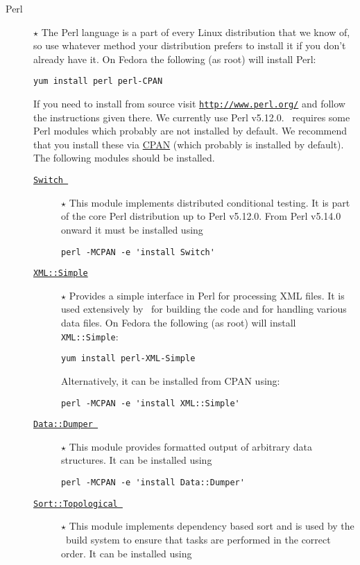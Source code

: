\begin{description}
 \item [Perl] $\star$ The Perl language is a part of every Linux distribution that we know of, so use whatever method your distribution prefers to install it if you don't already have it. On Fedora the following (as root) will install Perl:
\begin{verbatim}
yum install perl perl-CPAN
\end{verbatim}
 If you need to install from source visit \href{http://www.perl.org/}{\tt http://www.perl.org/} and follow the instructions given there. We currently use Perl v5.12.0. \glc\ requires some Perl modules which probably are not installed by default. We recommend that you install these via \href{http://www.cpan.org/}{CPAN} (which probably is installed by default). The following modules should be installed.
 \begin{description}
  \item [\href{http://search.cpan.org/~rgarcia/Switch-2.16/Switch.pm}{{\tt Switch }}] $\star$ This module implements distributed conditional testing. It is part of the core Perl distribution up to Perl v5.12.0. From Perl v5.14.0 onward it must be installed using
\begin{verbatim}
perl -MCPAN -e 'install Switch'
\end{verbatim}
  \item [\href{http://search.cpan.org/~grantm/XML-Simple-2.18/lib/XML/Simple.pm}{{\tt XML::Simple}}] $\star$ Provides a simple interface in Perl for processing XML files. It is used extensively by \glc\ for building the code and for handling various data files. On Fedora the following (as root) will install {\tt XML::Simple}:
\begin{verbatim}
yum install perl-XML-Simple
\end{verbatim}
Alternatively, it can be installed from CPAN using:
\begin{verbatim}
perl -MCPAN -e 'install XML::Simple'
\end{verbatim}
  \item [\href{http://search.cpan.org/~smueller/Data-Dumper-2.131/Dumper.pm}{{\tt Data::Dumper }}] $\star$ This module provides formatted output of arbitrary data structures. It can be installed using
\begin{verbatim}
perl -MCPAN -e 'install Data::Dumper'
\end{verbatim}
  \item [\href{http://search.cpan.org/~kstephens/Data-Match-0.06/lib/Sort/Topological.pm}{{\tt Sort::Topological }}] $\star$ This module implements dependency based sort and is used by the \glc\ build system to ensure that tasks are performed in the correct order. It can be installed using

\end{description}
\end{description}
